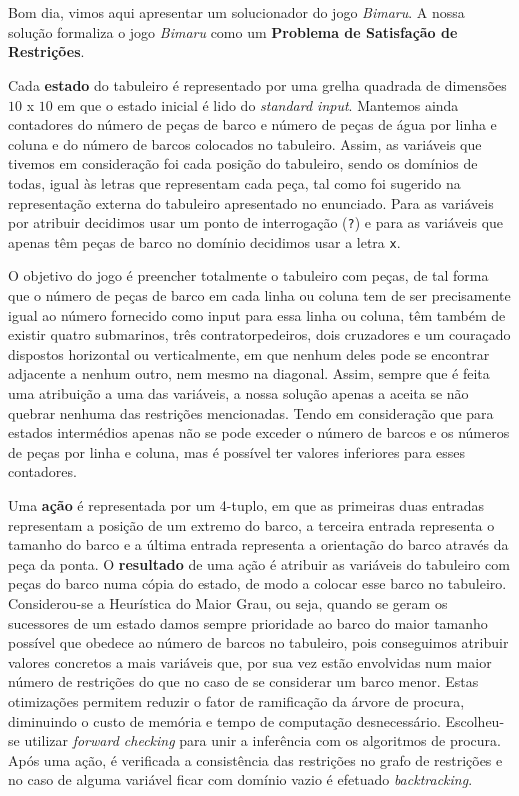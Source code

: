 \documentclass[12pt,a4paper]{article}
\begin{document}
\section*{}
\vspace*{10pt}

Bom dia, vimos aqui apresentar um solucionador do jogo \textit{Bimaru}.
A nossa solução formaliza o jogo \textit{Bimaru} como um \textbf{Problema de Satisfação de Restrições}.

Cada \textbf{estado} do tabuleiro é representado por uma grelha quadrada de dimensões $10$ x $10$ em que
o estado inicial é lido do \textit{standard input}. Mantemos ainda contadores do número de peças de barco e
número de peças de água por linha e coluna e do número de barcos colocados no tabuleiro.
Assim, as variáveis que tivemos em consideração foi cada posição do tabuleiro, sendo os domínios de todas, igual
às letras que representam cada peça, tal como foi sugerido na representação externa do tabuleiro
apresentado no enunciado. Para as variáveis por atribuir decidimos usar um ponto de interrogação (\texttt{?}) e para
as variáveis que apenas têm peças de barco no domínio decidimos usar a letra \texttt{x}.

O objetivo do jogo é preencher totalmente o tabuleiro com peças, de tal forma que o número de peças de barco em cada linha ou coluna tem de ser
precisamente igual ao número fornecido como input para essa linha ou coluna, têm também de existir quatro submarinos, três contratorpedeiros,
dois cruzadores e um couraçado dispostos horizontal ou verticalmente, em que nenhum deles pode se encontrar adjacente a nenhum outro, nem
mesmo na diagonal.
Assim, sempre que é feita uma atribuição a uma das variáveis, a nossa solução apenas a aceita se não quebrar nenhuma das restrições
mencionadas. Tendo em consideração que para estados intermédios apenas não se pode exceder o número de barcos e os números de peças
por linha e coluna, mas é possível ter valores inferiores para esses contadores.

Uma \textbf{ação} é representada por um 4-tuplo, em que as primeiras duas entradas representam a posição de um extremo do barco, a terceira entrada representa o
tamanho do barco e a última entrada representa a orientação do barco através da peça da ponta. O \textbf{resultado} de uma ação é atribuir as variáveis
do tabuleiro com peças do barco numa cópia do estado, de modo a colocar esse barco no tabuleiro.
Considerou-se a Heurística do Maior Grau, ou seja, quando se geram os sucessores de um estado damos sempre prioridade ao barco do maior tamanho possível
que obedece ao número de barcos no tabuleiro, pois conseguimos atribuir valores concretos a mais variáveis que, por sua vez estão envolvidas
num maior número de restrições do que no caso de se considerar um barco menor.
Estas otimizações permitem reduzir o fator de ramificação da árvore de procura, diminuindo o custo de memória e tempo de computação desnecessário.
Escolheu-se utilizar \textit{forward checking} para unir a inferência com os algoritmos de procura. Após uma ação, é verificada a consistência das restrições
no grafo de restrições e no caso de alguma variável ficar com domínio vazio é efetuado \textit{backtracking}.
\end{document}
